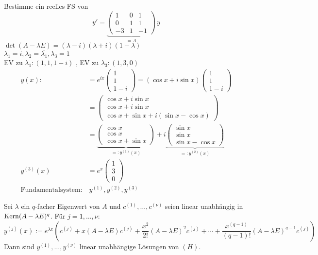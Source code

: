\documentclass{article}
\begin{document}
\begin{beispiele}
\item Bestimme ein reelles FS von
$$y' = \underbrace{\begin{pmatrix}1 & 0 & 1 \\ 0 & 1 & 1 \\ -3 & 1 & -1\end{pmatrix}}_{=A} \, y$$
$\det(A - \lambda E) = (\lambda - i)(\lambda + i)(1 - \lambda)$ \\
$\lambda_1 = i, \lambda_2 = \overline{\lambda_1}, \lambda_3 = 1$ \\
EV zu $\lambda_1: (1, 1, 1-i)$ , EV zu $\lambda_3: (1, 3, 0)$ \\
\begin{align*}
y(x) :&= e^{ix}\begin{pmatrix} 1\\1\\1-i \end{pmatrix} = (\cos x + i\sin x)\begin{pmatrix} 1\\1\\1-i \end{pmatrix} \\
     &= \begin{pmatrix} \cos x + i\sin x \\ \cos x + i\sin x \\ \cos x + \sin x + i(\sin x - \cos x) \end{pmatrix} \\
     &=\underbrace{\begin{pmatrix} \cos x \\ \cos x \\ \cos x + \sin x\end{pmatrix}}_{=:y^{(1)}(x)} + i\underbrace{\begin{pmatrix} \sin x \\ \sin x \\ \sin x - \cos x \end{pmatrix}}_{=:y^{(2)}(x)} \\
y^{(3)}(x) &= e^x\begin{pmatrix}1\\3\\0\end{pmatrix} \\
\text{Fundamentalsystem:}&\ y^{(1)}, y^{(2)}, y^{(3)}
\end{align*}
\end{beispiele}

\begin{hilfssatz}[1]
Sei $\lambda$ ein $q$-facher Eigenwert von $A$ und $c^{(1)},\ldots,c^{(\nu)}$ seien linear unabhängig in $\mathop{\rm Kern}\nolimits (A-\lambda E)^q$. Für $j=1,\ldots,\nu$:
\[ y^{(j)}(x) := e^{\lambda x} \left( c^{(j)} + x(A-\lambda E) c^{(j)} + \frac{x^2}{2!} (A-\lambda E)^2 c^{(j)} + \cdots + \frac{x^{(q-1)}}{(q-1)!} (A-\lambda E)^{q-1}c^{(j)} \right) \]
Dann sind $y^{(1)},\ldots, y^{(\nu)}$ linear unabhängige Lösungen von $(H)$.
\end{hilfssatz}
\end{document}
